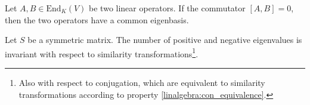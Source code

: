         \begin{property}
		Let $A, B \in \text{End}_K(V)$ be two linear operators. If the commutator $[A, B] = 0$, then the two operators have a common eigenbasis.
	\end{property}
        
        \begin{theorem}
        	Let $S$ be a symmetric matrix. The number of positive and negative eigenvalues is invariant with respect to similarity transformations\footnote{Also with respect to conjugation, which are equivalent to similarity transformations according to property \ref{linalgebra:con_equivalence}.}.
        \end{theorem}
